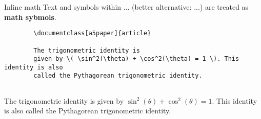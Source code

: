 \copyrightTim
\begin{frame}[fragile]{Inline math}
    Text and symbols within \texttt{$...$} (better alternative: \texttt{\(...\)}) are treated as \textbf{math sybmols}.

    \begin{verbatim}
        \documentclass[a5paper]{article}
        
        The trigonometric identity is 
        given by \( \sin^2(\theta) + \cos^2(\theta) = 1 \). This identity is also 
        called the Pythagorean trigonometric identity.
        
    \end{verbatim}
    \begin{tcolorbox}[width=13cm]
        The trigonometric identity is 
        given by \( \sin^2(\theta) + \cos^2(\theta) = 1 \). This identity is also 
        called the Pythagorean trigonometric identity.
    \end{tcolorbox}
\end{frame}